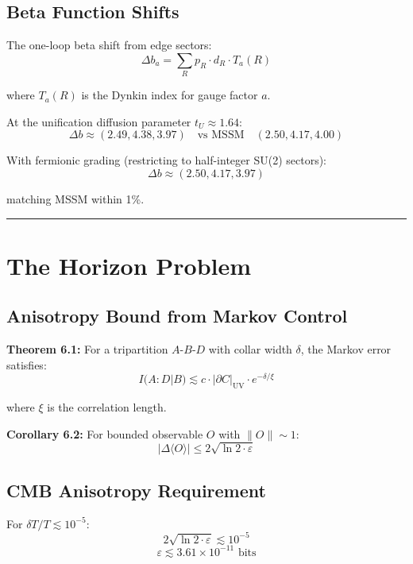 \subsection{Beta Function Shifts}\label{55-beta-function-shifts}

The one-loop beta shift from edge sectors: \[\Delta b_a = \sum_R p_R \cdot d_R \cdot T_a(R)\]

where \(T_a(R)\) is the Dynkin index for gauge factor \(a\).

At the unification diffusion parameter \(t_U \approx 1.64\): \[\Delta b \approx (2.49, 4.38, 3.97) \quad \text{vs MSSM} \quad (2.50, 4.17, 4.00)\]

With fermionic grading (restricting to half-integer SU(2) sectors): \[\Delta b \approx (2.50, 4.17, 3.97)\]

matching MSSM within 1\%.

\begin{center}\rule{0.5\linewidth}{0.5pt}\end{center}

\section{The Horizon Problem}\label{6-the-horizon-problem}

\subsection{Anisotropy Bound from Markov Control}\label{61-anisotropy-bound-from-markov-control}

\textbf{Theorem 6.1:} For a tripartition \(A\)-\(B\)-\(D\) with collar width \(\delta\), the Markov error satisfies: \[I(A:D|B) \lesssim c \cdot |\partial C|_{\text{UV}} \cdot e^{-\delta/\xi}\]

where \(\xi\) is the correlation length.

\textbf{Corollary 6.2:} For bounded observable \(O\) with \(\|O\| \sim 1\): \[|\Delta\langle O \rangle| \leq 2\sqrt{\ln 2 \cdot \varepsilon}\]

\subsection{CMB Anisotropy Requirement}\label{62-cmb-anisotropy-requirement}

For \(\delta T/T \lesssim 10^{-5}\): \[2\sqrt{\ln 2 \cdot \varepsilon} \lesssim 10^{-5}\] \[\varepsilon \lesssim 3.61 \times 10^{-11} \text{ bits}\]

